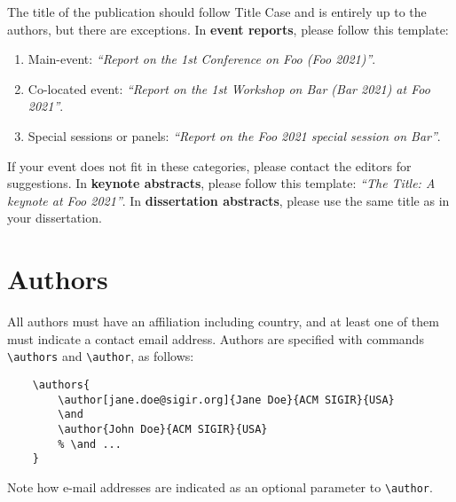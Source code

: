 \documentclass[news]{sigirforum}
\begin{document}
The title of the publication should follow Title Case and is entirely up to the authors, but there are exceptions. In \textbf{event reports}, please follow this template:
\begin{enumerate}
	\item Main-event: \textsl{``Report on the 1st Conference on Foo (Foo 2021)''}.
	\item Co-located event: \textsl{``Report on the 1st Workshop on Bar (Bar 2021) at Foo 2021''}.
	\item Special sessions or panels: \textsl{``Report on the Foo 2021 special session on Bar''}.
\end{enumerate}

If your event does not fit in these categories, please contact the editors for suggestions. In \textbf{keynote abstracts}, please follow this template: \textsl{``The Title: A keynote at Foo 2021''}. In \textbf{dissertation abstracts}, please use the same title as in your dissertation.

\section{Authors}

All authors must have an affiliation including country, and at least one of them must indicate a contact email address. Authors are specified with commands \texttt{\textbackslash authors} and \texttt{\textbackslash author}, as follows:
\begin{verbatim}
    \authors{
        \author[jane.doe@sigir.org]{Jane Doe}{ACM SIGIR}{USA}
        \and
        \author{John Doe}{ACM SIGIR}{USA}
        % \and ...
    }
\end{verbatim}
Note how e-mail addresses are indicated as an optional parameter to \texttt{\textbackslash author}.
\end{document}
